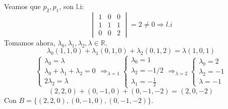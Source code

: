 \documentclass[10pt,a4paper,openright]{book}
\theoremstyle{break}
\begin{document}
Veamos que $p_2, p_1$, son l.i:
\[
    \begin{vmatrix} 1 & 0 & 0\\ 1 & 1 & 1\\ 0 & 0 & 2 \end{vmatrix} = 2 \neq 0 \Rightarrow l.i
\]
Tomamos ahora, $\lambda_0, \lambda_1, \lambda_2, \lambda \in \mathbb{R}$. 
\[
\lambda_0\left( 1, 1, 0 \right) + \lambda_1\left( 0, 1, 0 \right) + \lambda_2\left( 0, 1, 2 \right) = \lambda\left( 1, 0, 1 \right) 
\]\[
\begin{cases}
    \lambda_0 = \lambda\\
    \lambda_0 + \lambda_1 + \lambda_2 = 0\\
    2\lambda_2 = \lambda
\end{cases} \Rightarrow_{\lambda = 1} \begin{cases}
   \lambda_0 = 1\\
   \lambda_2 = -1/2\\
   \lambda_1 = -\frac{1}{2} 
\end{cases} \Rightarrow_{\lambda = 2} \begin{cases}
    \lambda_0 = 2\\
    \lambda_2 = -1\\
    \lambda = -1
\end{cases} 
\]\[
\left( 2, 2, 0 \right) + \left( 0, -1, 0 \right) + \left( 0, -1, -2 \right) = \left( 2, 0, -2 \right) 
\]
Con $B = \{\left( 2, 2, 0 \right), \left( 0, -1, 0 \right), \left( 0, -1, -2 \right) \}$.
\end{document}
